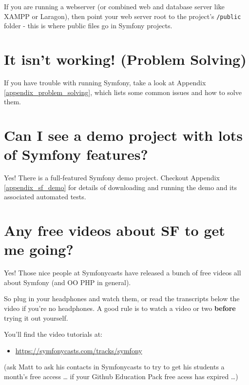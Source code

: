 \documentclass[a4paperpaper,openright]{book}
\providecommand{\tightlist}{%
  \setlength{\itemsep}{0pt}\setlength{\parskip}{0pt}}
\begin{document}
If you are running a webserver (or combined web and database server like
XAMPP or Laragon), then point your web server root to the project's
\texttt{/public} folder - this is where public files go in Symfony
projects.

\hypertarget{it-isnt-working-problem-solving}{%
\section{It isn't working! (Problem
Solving)}\label{it-isnt-working-problem-solving}}

If you have trouble with running Symfony, take a look at Appendix
\ref{appendix_problem_solving}, which lists some common issues and how
to solve them.

\hypertarget{can-i-see-a-demo-project-with-lots-of-symfony-features}{%
\section{Can I see a demo project with lots of Symfony
features?}\label{can-i-see-a-demo-project-with-lots-of-symfony-features}}

Yes! There is a full-featured Symfony demo project. Checkout Appendix
\ref{appendix_sf_demo} for details of downloading and running the demo
and its associated automated tests.

\hypertarget{any-free-videos-about-sf-to-get-me-going}{%
\section{Any free videos about SF to get me
going?}\label{any-free-videos-about-sf-to-get-me-going}}

Yes! Those nice people at Symfonycasts have released a bunch of free
videos all about Symfony (and OO PHP in general).

So plug in your headphones and watch them, or read the transcripts below
the video if you're no headphones. A good rule is to watch a video or
two \textbf{before} trying it out yourself.

You'll find the video tutorials at:

\begin{itemize}
\tightlist
\item
  \url{https://symfonycasts.com/tracks/symfony}
\end{itemize}

(ask Matt to ask his contacts in Symfonycasts to try to get his students
a month's free access \ldots{} if your Github Education Pack free acess
has expired \ldots{})
\end{document}
